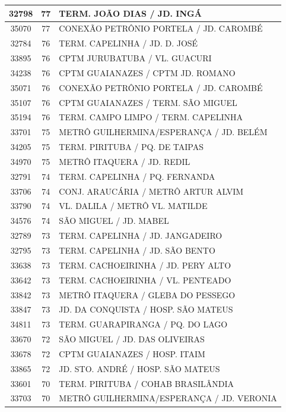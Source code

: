 \documentclass[
	12pt,				%
	oneside,			%
	a4paper,			%
	english,			%
	brazil				%
	]{abntex2ppgsi}
\begin{document}
{{{\begin{apendicesenv}
\begin{longtable}{c|c|p{7cm}}
 \hline 
32798 &	77 &	TERM. JOÃO DIAS / JD. INGÁ \\ 
 \hline 
35070 &	77 &	CONEXÃO PETRÔNIO PORTELA / JD. CAROMBÉ \\ 
 \hline 
32784 &	76 &	TERM. CAPELINHA / JD. D. JOSÉ \\ 
 \hline 
33895 &	76 &	CPTM JURUBATUBA / VL. GUACURI \\ 
 \hline 
34238 &	76 &	CPTM GUAIANAZES / CPTM JD. ROMANO \\ 
 \hline 
35071 &	76 &	CONEXÃO PETRÔNIO PORTELA / JD. CAROMBÉ \\ 
 \hline 
35107 &	76 &	CPTM GUAIANAZES / TERM. SÃO MIGUEL \\ 
 \hline 
35194 &	76 &	TERM. CAMPO LIMPO / TERM. CAPELINHA \\ 
 \hline 
33701 &	75 &	METRÔ GUILHERMINA/ESPERANÇA / JD. BELÉM \\ 
 \hline 
34205 &	75 &	TERM. PIRITUBA / PQ. DE TAIPAS \\ 
 \hline 
34970 &	75 &	METRÔ ITAQUERA / JD. REDIL \\ 
 \hline 
32791 &	74 &	TERM. CAPELINHA / PQ. FERNANDA \\ 
 \hline 
33706 &	74 &	CONJ. ARAUCÁRIA / METRÔ ARTUR ALVIM \\ 
 \hline 
33790 &	74 &	VL. DALILA / METRÔ VL. MATILDE \\ 
 \hline 
34576 &	74 &	SÃO MIGUEL / JD. MABEL \\ 
 \hline 
32789 &	73 &	TERM. CAPELINHA / JD. JANGADEIRO \\ 
 \hline 
32795 &	73 &	TERM. CAPELINHA / JD. SÃO BENTO \\ 
 \hline 
33638 &	73 &	TERM. CACHOEIRINHA / JD. PERY ALTO \\ 
 \hline 
33642 &	73 &	TERM. CACHOEIRINHA / VL. PENTEADO \\ 
 \hline 
33842 &	73 &	METRÔ ITAQUERA / GLEBA DO PESSEGO \\ 
 \hline 
33847 &	73 &	JD. DA CONQUISTA / HOSP. SÃO MATEUS \\ 
 \hline 
34811 &	73 &	TERM. GUARAPIRANGA / PQ. DO LAGO \\ 
 \hline 
33670 &	72 &	SÃO MIGUEL / JD. DAS OLIVEIRAS \\ 
 \hline 
33678 &	72 &	CPTM GUAIANAZES / HOSP. ITAIM \\ 
 \hline 
33865 &	72 &	JD. STO. ANDRÉ / HOSP. SÃO MATEUS \\ 
 \hline 
33601 &	70 &	TERM. PIRITUBA / COHAB BRASILÂNDIA \\ 
 \hline 
33703 &	70 &	METRÔ GUILHERMINA/ESPERANÇA / JD. VERONIA \\ 

\end{longtable}
\end{apendicesenv}}}}
\end{document}
